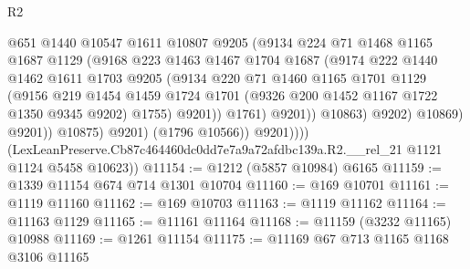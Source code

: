 \begin{lexlean}{R2}
\begin{coremodule}
                                @651
                                @1440
                                @10547
                                @1611
                                @10807
                                @9205
                                (@9134
                                  @224
                                  @71
                                  @1468
                                  @1165
                                  @1687
                                  @1129
                                  (@9168
                                    @223
                                    @1463
                                    @1467
                                    @1704
                                    @1687
                                    (@9174
                                      @222
                                      @1440
                                      @1462
                                      @1611
                                      @1703
                                      @9205
                                      (@9134
                                        @220
                                        @71
                                        @1460
                                        @1165
                                        @1701
                                        @1129
                                        (@9156
                                          @219
                                          @1454
                                          @1459
                                          @1724
                                          @1701
                                          (@9326 @200 @1452 @1167 @1722 @1350 @9345 @9202)
                                          @1755)
                                        @9201))
                                    @1761)
                                  @9201))
                              @10863)
                            @9202)
                          @10869)
                        @9201))
                    @10875)
                  @9201)
                (@1796 @10566))
              @9201))))
      (LexLeanPreserve.Cb87c464460dc0dd7e7a9a72afdbc139a.R2.__rel_21 @1121 @1124 @5458 @10623))
@11154 := @1212 (@5857 @10984) @6165
@11159 := @1339 @11154 @674 @714 @1301 @10704
@11160 := @169 @10701
@11161 := @1119 @11160
@11162 := @169 @10703
@11163 := @1119 @11162
@11164 := @11163 @1129
@11165 := @11161 @11164
@11168 := @11159 (@3232 @11165) @10988
@11169 := @1261 @11154
@11175 := @11169 @67 @713 @1165 @1168 @3106 @11165

\end{coremodule}
\end{lexlean}
